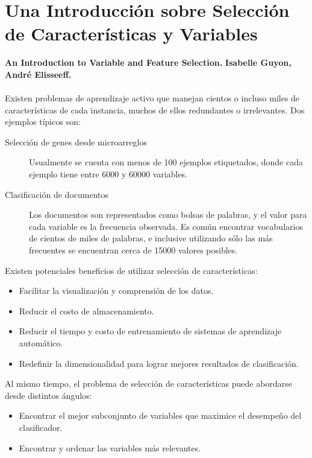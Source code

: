 \documentclass[11pt,spanish]{article}
\begin{document}
\section{Una Introducción sobre Selección de Características y Variables}
\textbf{An Introduction to Variable and Feature Selection.}
\textbf{Isabelle Guyon, André Elisseeff.}\\\\
Existen problemas de aprendizaje activo que manejan cientos o incluso miles de
características de cada instancia, muchos de ellos redundantes o irrelevantes.
Dos ejemplos típicos son:
\begin{description}
    \item[Selección de genes desde microarreglos] Usualmente se cuenta con menos
    de 100 ejemplos etiquetados, donde cada ejemplo tiene entre 6000 y 60000
    variables.
    \item[Clasificación de documentos] Los documentos son representados como
    bolsas de palabras, y el valor para cada variable es la frecuencia
    observada. Es común encontrar vocabularios de cientos de miles de palabras,
    e inclusive utilizando sólo las más frecuentes se encuentran cerca de 15000
    valores posibles.
\end{description}
Existen potenciales beneficios de utilizar selección de características:
\begin{itemize}
    \item Facilitar la visualización y comprensión de los datos.
    \item Reducir el costo de almacenamiento.
    \item Reducir el tiempo y costo de entrenamiento de sistemas de aprendizaje
    automático.
    \item Redefinir la dimensionalidad para lograr mejores resultados de
    clasificación.
\end{itemize}
Al mismo tiempo, el problema de selección de características puede abordarse
desde distintos ángulos:
\begin{itemize}
    \item Encontrar el mejor subconjunto de variables que maximice el desempeño
    del clasificador.
    \item Encontrar y ordenar las variables más relevantes.
\end{itemize}
\end{document}
